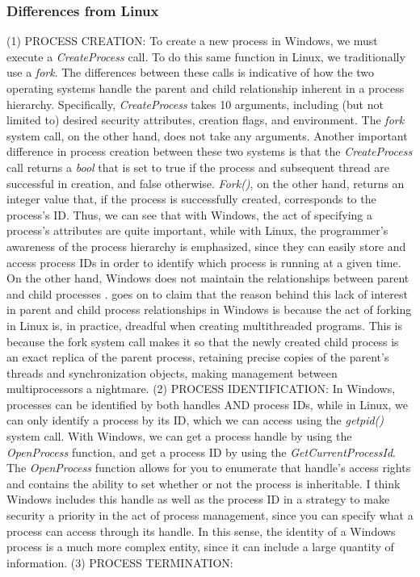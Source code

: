 \documentclass[letterpaper,10pt,titlepage]{article}
\begin{document}
\subsubsection{Differences from Linux}
(1) PROCESS CREATION: To create a new process in Windows, we must execute a \emph{CreateProcess} call. To do this same function in Linux, we traditionally use a \emph{fork}. The differences between these calls is indicative of how the two operating systems handle the parent and child relationship inherent in a process hierarchy. Specifically, \emph{CreateProcess} takes 10 arguments, including (but not limited to) desired security attributes, creation flags, and environment. The \emph{fork} system call, on the other hand, does not take any arguments. Another important difference in process creation between these two systems is that the \emph{CreateProcess} call returns a \emph{bool} that is set to true if the process and subsequent thread are successful in creation, and false otherwise. \emph{Fork()}, on the other hand, returns an integer value that, if the process is successfully created, corresponds to the process's ID. Thus, we can see that with Windows, the act of specifying a process's attributes are quite important, while with Linux, the programmer's awareness of the process hierarchy is emphasized, since they can easily store and access process IDs in order to identify which process is running at a given time. On the other hand, Windows does not maintain the relationships between parent and child processes \cite{har04}. \cite{har04} goes on to claim that the reason behind this lack of interest in parent and child process relationships in Windows is because the act of forking in Linux is, in practice, dreadful when creating multithreaded programs. This is because the fork system call makes it so that the newly created child process is an exact replica of the parent process, retaining precise copies of the parent's threads and synchronization objects, making management between multiprocessors a nightmare. 
(2) PROCESS IDENTIFICATION: In Windows, processes can be identified by both handles AND process IDs, while in Linux, we can only identify a process by its ID, which we can access using the \emph{getpid()} system call. With Windows, we can get a process handle by using the \emph{OpenProcess} function, and get a process ID by using the \emph{GetCurrentProcessId}. The \emph{OpenProcess} function allows for you to enumerate that handle's access rights and contains the ability to set whether or not the process is inheritable. I think Windows includes this handle as well as the process ID in a strategy to make security a priority in the act of process management, since you can specify what a process can access through its handle. In this sense, the identity of a Windows process is a much more complex entity, since it can include a large quantity of information.
(3) PROCESS TERMINATION:
\end{document}
